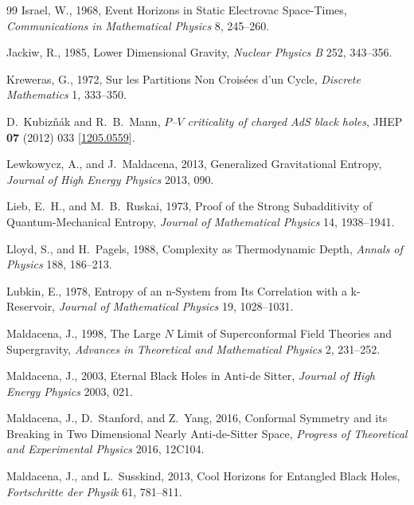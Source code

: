\documentclass[11pt,letterpaper]{article}
\theoremstyle{plain}
\theoremstyle{definition}
\theoremstyle{remark}
\begin{document}
\begin{thebibliography}{99}
Israel, W., 1968, Event Horizons in Static Electrovac Space-Times, \textit{Communications in Mathematical Physics} 8, 245--260.

Jackiw, R., 1985, Lower Dimensional Gravity, \textit{Nuclear Physics B} 252, 343--356.

Kreweras, G., 1972, Sur les Partitions Non Crois\'{e}es d'un Cycle, \textit{Discrete Mathematics} 1, 333--350.

D.~Kubiz\v{n}\'{a}k and R.~B.~Mann, \emph{$P$--$V$ criticality of charged AdS black holes},
JHEP \textbf{07} (2012) 033
[\href{https://arxiv.org/abs/1205.0559}{1205.0559}].

Lewkowycz, A., and J.~Maldacena, 2013, Generalized Gravitational Entropy, \textit{Journal of High Energy Physics} 2013, 090.

Lieb, E.~H., and M.~B.~Ruskai, 1973, Proof of the Strong Subadditivity of Quantum-Mechanical Entropy, \textit{Journal of Mathematical Physics} 14, 1938--1941.

Lloyd, S., and H.~Pagels, 1988, Complexity as Thermodynamic Depth, \textit{Annals of Physics} 188, 186--213.

Lubkin, E., 1978, Entropy of an n-System from Its Correlation with a k-Reservoir, \textit{Journal of Mathematical Physics} 19, 1028--1031.

Maldacena, J., 1998, The Large $N$ Limit of Superconformal Field Theories and Supergravity, \textit{Advances in Theoretical and Mathematical Physics} 2, 231--252.

Maldacena, J., 2003, Eternal Black Holes in Anti-de Sitter, \textit{Journal of High Energy Physics} 2003, 021.

Maldacena, J., D.~Stanford, and Z.~Yang, 2016, Conformal Symmetry and its Breaking in Two Dimensional Nearly Anti-de-Sitter Space, \textit{Progress of Theoretical and Experimental Physics} 2016, 12C104.

Maldacena, J., and L.~Susskind, 2013, Cool Horizons for Entangled Black Holes, \textit{Fortschritte der Physik} 61, 781--811.


\end{thebibliography}
\end{document}
